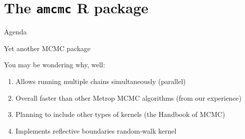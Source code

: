 \documentclass[9pt,handout,ignorenonframetext,]{beamer}
\begin{document}
\section{\texorpdfstring{The \texttt{amcmc} R
package}{The amcmc R package}}\label{the-amcmc-r-package}

\begin{frame}[t]{Agenda}

\tableofcontents[currentsection]

\end{frame}

\begin{frame}{Yet another MCMC package}

You may be wondering why, well:

\begin{enumerate}
\def\labelenumi{\arabic{enumi}.}
\item
  Allows running multiple chains simultaneously (parallel)
\item
  Overall faster than other Metrop MCMC algorithms (from our experience)
\item
  Planning to include other types of kernels (the Handbook of MCMC)
\item
  Implements reflective boundaries random-walk kernel
\end{enumerate}

\end{frame}
\end{document}
